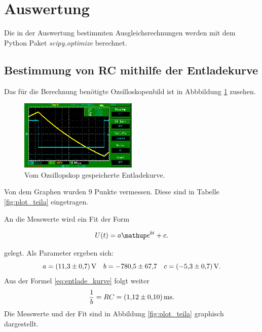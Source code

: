 \section{Auswertung}
Die in der Auswertung bestimmten Ausgleichsrechnungen werden mit
dem Python Paket \emph{scipy.optimize} berechnet.

\subsection{Bestimmung von RC mithilfe der Entladekurve}

Das für die Berechnung benötigte Ozsilloskopenbild ist in Abbbildung \ref{fig:entladekurve} zusehen.

\begin{figure}
  \centering
  \includegraphics[width=0.5\textwidth]{pics/bilda_508hz.png}
  \caption{Vom Ozsillopskop gespeicherte Entladekurve.}
  \label{fig:entladekurve}
\end{figure}
Von dem Graphen wurden $9$ Punkte vermessen.
Diese sind in Tabelle \ref{fig:plot_teila} eingetragen.
\FloatBarrier

\FloatBarrier
An die Messwerte wird ein Fit der Form

\begin{equation*}
  U(t)=a\map{e}^{bt}+c.
\end{equation*}

gelegt.
Als Parameter ergeben sich:
\begin{equation}
  \label{eq:parameter_teila}
a=\SI{11.3\pm0.7}{\volt} \quad b=\num{-780.5\pm67.7} \quad c=\SI{-5.3\pm0.7}{\volt}.
\end{equation}
Aus der Formel  \eqref{eq:entlade_kurve} folgt weiter
\begin{equation}
  \frac{1}{b}=RC=\SI{1.12\pm0.1}{\milli\second}.
\end{equation}
Die Messwerte und der Fit sind in Abbildung \ref{fig:plot_teila}  graphisch
dargestellt.


